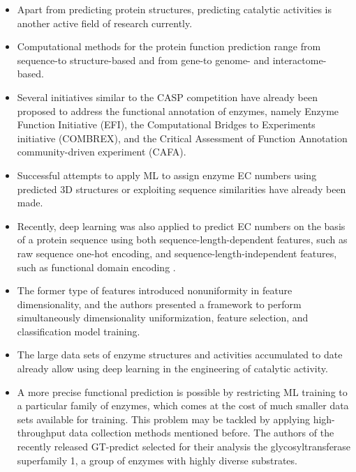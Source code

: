 \documentclass[12pt]{article}
\begin{document}
\begin{itemize}
\item Apart from predicting protein structures, predicting catalytic activities is another active ﬁeld of research currently. 

\item Computational methods for the protein function prediction range from sequence-to structure-based and from gene-to genome- and interactome-based\cite{62}. 


\item Several initiatives similar to the CASP competition have already been proposed to address the functional annotation of enzymes, namely Enzyme Function Initiative (EFI), the Computational Bridges to Experiments initiative (COMBREX), and the Critical Assessment of Function Annotation community-driven experiment (CAFA). 


\item Successful attempts to apply ML to assign enzyme EC numbers using predicted 3D structures \cite{63} or exploiting sequence similarities \cite{64} have already been made. 

\item Recently, deep learning was also applied to predict EC numbers on the basis of a protein sequence using both sequence-length-dependent features, such as raw sequence one-hot encoding, and sequence-length-independent features, such as functional domain encoding \cite{65}.


\item The former type of features introduced nonuniformity in feature dimensionality, and the authors presented a framework to perform simultaneously dimensionality uniformization, feature selection, and classiﬁcation model training. 

\item The large data sets of enzyme structures and activities accumulated to date already allow using deep learning in the engineering of catalytic activity. 


\item A more precise functional prediction is possible by restricting ML training to a particular family of enzymes, which comes at the cost of much smaller data sets available for training. This problem may be tackled by applying high-throughput data collection methods mentioned before. The authors of the recently released GT-predict \cite{66} selected for their analysis the glycosyltransferase superfamily 1, a group of enzymes with highly diverse substrates. 



\end{itemize}
\end{document}
